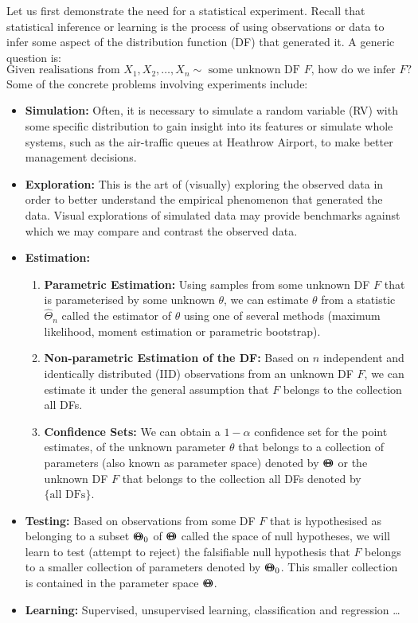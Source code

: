 Let us first demonstrate the need for a statistical experiment.  Recall that statistical inference or learning is the process of using observations or data to infer some aspect of the distribution function (DF) that generated it.  A generic question is:
\[
\text{Given realisations from $X_1, X_2, \ldots, X_n \sim$ some unknown DF $F$, how do we infer $F$} ?
\]
Some of the concrete problems involving experiments include:
\begin{itemize}
\item {\bf Simulation:} Often, it is necessary to simulate a random variable (RV) with some specific distribution to gain insight into its features or simulate whole systems, such as the air-traffic queues at Heathrow Airport, to make better management decisions.
\item {\bf Exploration:} This is the art of (visually) exploring the observed data in order to better understand the empirical phenomenon that generated the data.  Visual explorations of simulated data may provide benchmarks against which we may compare and contrast the observed data.
\item {\bf Estimation:}
\begin{enumerate}
\item {\bf Parametric Estimation:} Using samples from some unknown DF $F$ that is parameterised by some unknown $\theta$, we can estimate $\theta$ from a statistic $\widehat{\Theta}_n$ called the estimator of $\theta$ using one of several methods (maximum likelihood, moment estimation or parametric bootstrap).
\item {\bf Non-parametric Estimation of the DF:}  Based on $n$ independent and identically distributed (IID) observations from an unknown DF $F$, we can estimate it under the general assumption that $F$ belongs to the collection all DFs.
\item {\bf Confidence Sets:}  We can obtain a $1-\alpha$ confidence set for the point estimates, of the unknown parameter $\theta$  that belongs to a collection of parameters (also known as parameter space) denoted by ${\Theta}\mspace{-11 mu}{\Theta}$ or the unknown  DF $F$ that belongs to the collection all DFs denoted by $\{ \text{all DFs} \}$.
\end{enumerate}
\item {\bf Testing:}  Based on observations from some DF $F$ that is hypothesised as belonging to a subset ${\Theta}\mspace{-11 mu}{\Theta}_0$ of ${\Theta}\mspace{-11 mu}{\Theta}$ called the space of null hypotheses, we will learn to test (attempt to reject) the falsifiable null hypothesis that $F$ belongs to a smaller collection of parameters denoted by ${\Theta}\mspace{-11 mu}{\Theta}_0$.  This smaller collection is contained in the parameter space ${\Theta}\mspace{-11 mu}{\Theta}$.
\item {\bf Learning:}  Supervised, unsupervised learning, classification and regression \ldots
\end{itemize}

